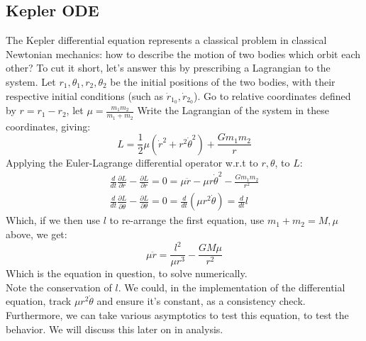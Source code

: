 \documentclass{article}
\begin{document}
\subsection{Kepler ODE}
The Kepler differential equation represents a classical problem in classical Newtonian mechanics: how to describe the motion of two bodies which orbit each other? To cut it short, let's answer this by prescribing a Lagrangian to the system. Let $r_1,\theta_1,r_2,\theta_2$ be the initial positions of the two bodies, with their respective initial conditions (such as $\dot{r}_{1_0},\dot{r}_{2_0}$). Go to relative coordinates defined by $r=r_1-r_2$, let $\mu=\frac{m_1 m_2}{m_1+m_2}$ Write the Lagrangian of the system in these coordinates, giving:
\begin{equation}
    L=\frac{1}{2}\mu (\dot{r}^2+r^2\dot{\theta}^2)+\frac{Gm_1m_2}{r}
\end{equation}
Applying the Euler-Lagrange differential operator w.r.t to $r,\theta$, to $L$:
\begin{gather}
 \frac{d}{dt}\frac{\partial L}{\partial \dot{r}}-\frac{\partial L}{\partial r}=0 = \mu\ddot{r}-\mu r \dot{\theta}^2-\frac{Gm_1m_2}{r^2}\\
 \frac{d}{dt}\frac{\partial L}{\partial \dot{\theta}}-\frac{\partial L}{\partial \theta}=0 = \frac{d}{dt}(\mu r^2\dot{\theta})=\frac{d}{dt}l
\end{gather}
Which, if we then use $l$ to re-arrange the first equation, use $m_1+m_2=M,\mu$ above, we get:
\begin{equation}
    \mu\ddot{r}=\frac{l^2}{\mu r^3}-\frac{GM\mu}{r^2}
\end{equation}
Which is the equation in question, to solve numerically. \\
Note the conservation of $l$. We could, in the implementation of the differential equation, track $\mu r^2 \dot{\theta}$ and ensure it's constant, as a consistency check. Furthermore, we can take various asymptotics to test this equation, to test the behavior. We will discuss this later on in analysis.
\end{document}
